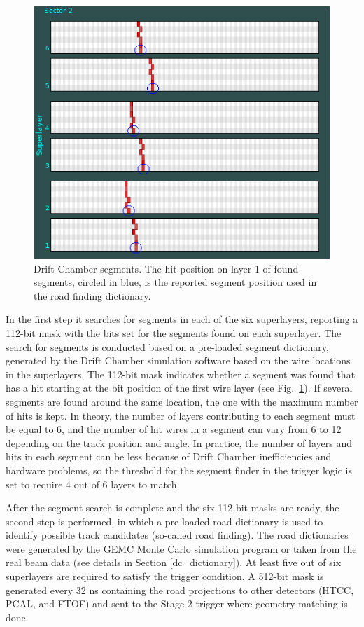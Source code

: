 \begin{figure}[hbt]
	\centering
	\includegraphics[width=1.0\columnwidth,keepaspectratio]{img/dc_segments.png}
	\caption{Drift Chamber segments. The hit position on layer 1 of found segments, circled in blue, is the reported segment position used in the road finding dictionary.}
	\label{fig:dc_segments}
\end{figure}

In the first step it searches for segments in each of the six superlayers, reporting a 112-bit mask with the bits set for the segments found on each superlayer. The search for segments is conducted based on a pre-loaded segment dictionary, generated by the Drift Chamber simulation software based on the wire locations in the superlayers. The 112-bit mask indicates whether a segment was found that has a hit starting at the bit position of the first wire layer (see Fig.~\ref{fig:dc_segments}). If several segments are found around the same location, the one with the maximum number of hits is kept. In theory, the number of layers contributing to each segment must be equal to 6, and the number of hit wires in a segment can vary from 6 to 12 depending on the track position and angle. In practice, the number of layers and hits in each segment can be less because of Drift Chamber inefficiencies and hardware problems, so the threshold for the segment finder in the trigger logic is set to require 4 out of 6 layers to match.

After the segment search is complete and the six 112-bit masks are ready, the second step is performed, in which a pre-loaded road dictionary is used to identify possible track candidates (so-called road finding). The road dictionaries were generated by the GEMC Monte Carlo simulation program \cite{gemc-ref} or taken from the real beam data (see details in Section \ref{dc_dictionary}). At least five out of six superlayers are required to satisfy the trigger condition. A 512-bit mask is generated every 32 ns containing the road projections to other detectors (HTCC, PCAL, and FTOF) and sent to the Stage 2 trigger where geometry matching is done.

